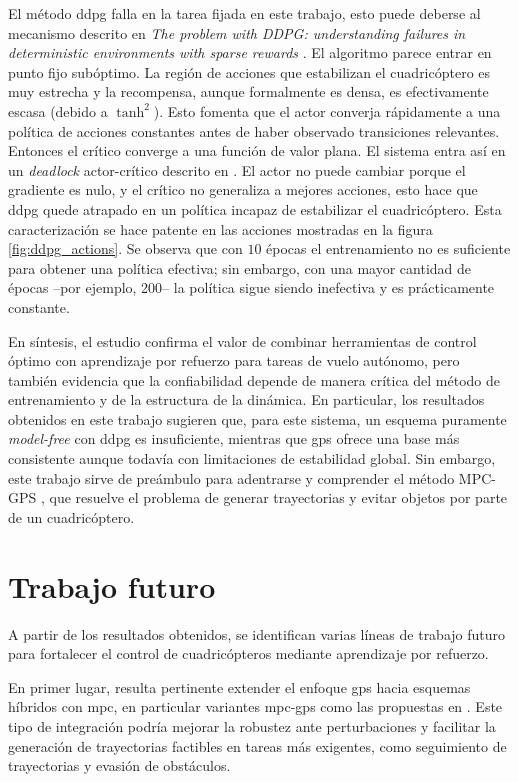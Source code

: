 El método \acrshort{ddpg} falla en la tarea fijada en este trabajo, esto puede deberse al mecanismo descrito en \textit{The problem with DDPG: understanding failures in deterministic environments with sparse rewards} \cite{Matheron2020}. El algoritmo parece entrar en punto fijo subóptimo. La región de acciones que estabilizan el cuadricóptero es muy estrecha y la recompensa, aunque formalmente es densa, es efectivamente escasa (debido a $\tanh^2$). Esto fomenta que el actor converja rápidamente a una política de acciones constantes antes de haber observado transiciones relevantes. Entonces el crítico converge a una función de valor plana. El sistema entra así en un \textit{deadlock} actor-crítico descrito en \cite{Matheron2020}. El actor no puede cambiar porque el gradiente es nulo, y el crítico no generaliza a mejores acciones, esto hace que \acrshort{ddpg} quede atrapado en un política incapaz de estabilizar el cuadricóptero. Esta caracterización se hace patente en las acciones mostradas en la figura \ref{fig:ddpg_actions}. Se observa que con $10$ épocas el entrenamiento no es suficiente para obtener una política efectiva; sin embargo, con una mayor cantidad de épocas –por ejemplo, 200– la política sigue siendo inefectiva y es prácticamente constante. 

En síntesis, el estudio confirma el valor de combinar herramientas de control óptimo con aprendizaje por refuerzo para tareas de vuelo autónomo, pero también evidencia que la confiabilidad depende de manera crítica del método de entrenamiento y de la estructura de la dinámica. En particular, los resultados obtenidos en este trabajo sugieren que, para este sistema, un esquema puramente \textit{model-free} con \acrshort{ddpg} es insuficiente, mientras que \acrshort{gps} ofrece una base más consistente aunque todavía con limitaciones de estabilidad global. Sin embargo, este trabajo sirve de preámbulo para adentrarse y comprender el método MPC-GPS \cite{zhang2016}, que resuelve el problema de generar trayectorias y evitar objetos por parte de un cuadricóptero. 

\section{Trabajo futuro}
A partir de los resultados obtenidos, se identifican varias líneas de trabajo futuro para fortalecer el control de cuadricópteros mediante aprendizaje por refuerzo.

En primer lugar, resulta pertinente extender el enfoque \acrshort{gps} hacia esquemas híbridos con \acrshort{mpc}, en particular variantes \acrshort{mpc}-\acrshort{gps} como las propuestas en \cite{zhang2016}. Este tipo de integración podría mejorar la robustez ante perturbaciones y facilitar la generación de trayectorias factibles en tareas más exigentes, como seguimiento de trayectorias y evasión de obstáculos.

